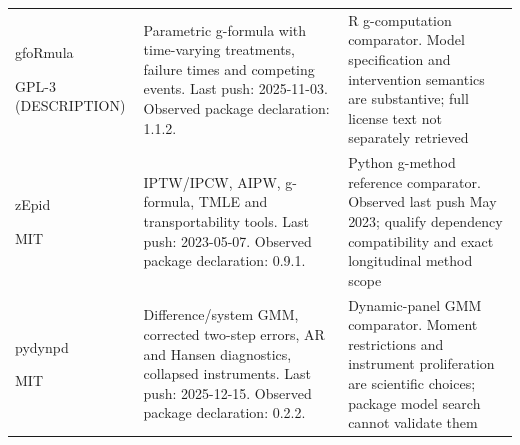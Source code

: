 \begin{longtable}{P{29mm}P{55mm}P{60mm}}
gfoRmula \citep{sw_gformula}\par GPL-3 (DESCRIPTION) & Parametric g-formula with time-varying treatments, failure times and competing events. Last push: 2025-11-03. Observed package declaration: 1.1.2. & R g-computation comparator. Model specification and intervention semantics are substantive; full license text not separately retrieved\\
zEpid \citep{sw_zepid}\par MIT & IPTW/IPCW, AIPW, g-formula, TMLE and transportability tools. Last push: 2023-05-07. Observed package declaration: 0.9.1. & Python g-method reference comparator. Observed last push May 2023; qualify dependency compatibility and exact longitudinal method scope\\
pydynpd \citep{sw_pydynpd}\par MIT & Difference/system GMM, corrected two-step errors, AR and Hansen diagnostics, collapsed instruments. Last push: 2025-12-15. Observed package declaration: 0.2.2. & Dynamic-panel GMM comparator. Moment restrictions and instrument proliferation are scientific choices; package model search cannot validate them\\
\bottomrule
\end{longtable}
